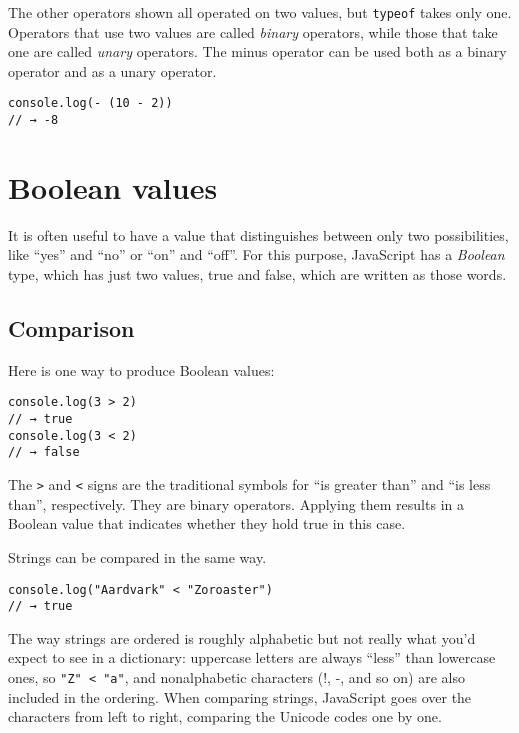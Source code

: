 The other operators shown all operated on two values, but \lstinline`typeof` takes only one. Operators that use two values are called \emph{binary} operators, while those that take one are called \emph{unary} operators. The minus operator can be used both as a binary operator and as a unary operator.

\begin{lstlisting}
console.log(- (10 - 2))
// → -8
\end{lstlisting}
\noindent

\section{Boolean values}

It is often useful to have a value that distinguishes between only two possibilities, like ``yes'' and ``no'' or ``on'' and ``off''. For this purpose, JavaScript has a \emph{Boolean} type, which has just two values, true and false, which are written as those words.

\subsection{Comparison}

Here is one way to produce Boolean values:

\begin{lstlisting}
console.log(3 > 2)
// → true
console.log(3 < 2)
// → false
\end{lstlisting}
\noindent{}

The \lstinline`>` and \lstinline`<` signs are the traditional symbols for ``is greater than'' and ``is less than'', respectively. They are binary operators. Applying them results in a Boolean value that indicates whether they hold true in this case.

Strings can be compared in the same way.

\begin{lstlisting}
console.log("Aardvark" < "Zoroaster")
// → true
\end{lstlisting}
\noindent{}

The way strings are ordered is roughly alphabetic but not really what you'd expect to see in a dictionary: uppercase letters are always ``less'' than lowercase ones, so \lstinline`"Z" < "a"`, and nonalphabetic characters (!, -, and so on) are also included in the ordering. When comparing strings, JavaScript goes over the characters from left to right, comparing the Unicode codes one by one.

